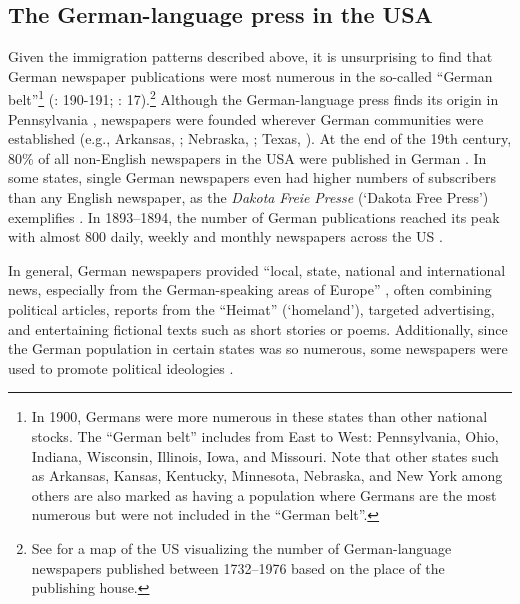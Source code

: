 \documentclass[output=paper]{langsci/langscibook}
\begin{document}
\subsection{The German-language press in the USA} %
\label{sec:rocker:2.2}

Given the immigration patterns described above, it is unsurprising to find that German newspaper publications were most numerous in the so-called “German belt”\footnote{In 1900, Germans were more numerous in these states than other national stocks. The “German belt” includes from East to West: Pennsylvania, Ohio, Indiana, Wisconsin, Illinois, Iowa, and Missouri. Note that other states such as Arkansas, Kansas, Kentucky, Minnesota, Nebraska, and New York among others are also marked as having a population where Germans are the most numerous but were not included in the “German belt”.} (\citealt{Dolmetsch1976}: 190-191; \citealt{Schwartzkopff1987}: 17).\footnote{See \citet[190-191]{Dolmetsch1976} for a map of the US visualizing the number of German-language newspapers published between 1732--1976 based on the place of the publishing house.} Although the German-language press finds its origin in Pennsylvania \citep[192]{Dolmetsch1976}, newspapers were founded wherever German communities were established (e.g., Arkansas, \citealt{Condray2015}; Nebraska, \citealt{Schach1984}; Texas, \citealt{Etzler1954}). At the end of the 19th century, 80\% of all non-English newspapers in the USA were published in German \citep[187]{Dolmetsch1976}. In some states, single German newspapers even had higher numbers of subscribers than any English newspaper, as the \textit{Dakota} \textit{Freie} \textit{Presse} (‘Dakota Free Press’) exemplifies \citep[84]{Schach1984}. In 1893--1894, the number of German publications reached its peak with almost 800 daily, weekly and monthly newspapers across the US \citep[208]{Wittke1973}.

In general, German newspapers provided “local, state, national and international news, especially from the German-speaking areas of Europe” \citep[91]{Schach1984}, often combining political articles, reports from the “Heimat” (‘homeland’), targeted advertising, and entertaining fictional texts such as short stories or poems. Additionally, since the German population in certain states was so numerous, some newspapers were used to promote political ideologies \citep[188]{Dolmetsch1976}.
\end{document}
